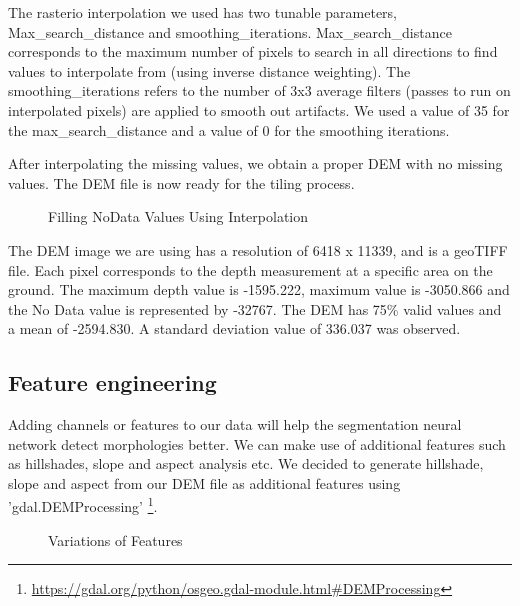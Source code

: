 \documentclass[sigconf,natbib=false]{acmart}
\begin{document}
The rasterio interpolation we used has two tunable parameters, Max\_search\_distance and smoothing\_iterations. Max\_search\_distance corresponds to the maximum number of pixels to search in all directions to find values to interpolate from (using inverse distance weighting). The smoothing\_iterations refers to the number of 3x3 average filters (passes to run on interpolated pixels) are applied to smooth out artifacts. We used a value of 35 for the max\_search\_distance and a value of 0 for the smoothing iterations.

After interpolating the missing values, we obtain a proper DEM with no missing values. The DEM file is now ready for the tiling process.
\begin{figure}[ht]
    \centering
    \caption{Filling NoData Values Using Interpolation}
\end{figure}

The DEM image we are using has a resolution of 6418 x 11339, and is a geoTIFF file. Each pixel corresponds to the depth measurement at a specific area on the ground. The maximum depth value is -1595.222, maximum value is -3050.866 and the No Data value is represented by -32767. The DEM has 75\% valid values and a mean of -2594.830. A standard deviation value of 336.037 was observed.

\subsection{Feature engineering}
Adding channels or features to our data will help the segmentation neural network detect morphologies better. We can make use of additional features such as hillshades, slope and aspect analysis etc. We decided to generate hillshade, slope and aspect from our DEM file as additional features using 'gdal.DEMProcessing'
\footnote{\url{https://gdal.org/python/osgeo.gdal-module.html\#DEMProcessing}}.
\begin{figure}[ht]
    \centering
    \caption{Variations of Features}
\end{figure}
\end{document}
